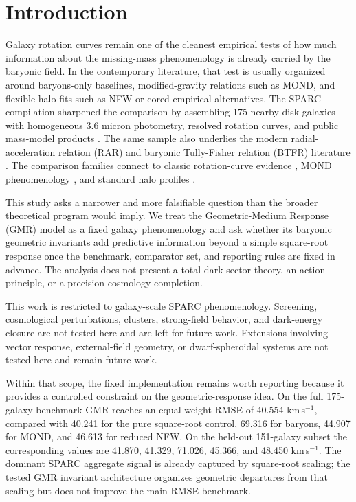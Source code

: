 ﻿\documentclass[twocolumn,linenumbers]{aastex701}
\begin{document}
\section{Introduction}

Galaxy rotation curves remain one of the cleanest empirical tests of how much information about the missing-mass phenomenology is already carried by the baryonic field. In the contemporary literature, that test is usually organized around baryons-only baselines, modified-gravity relations such as MOND, and flexible halo fits such as NFW or cored empirical alternatives. The SPARC compilation sharpened the comparison by assembling 175 nearby disk galaxies with homogeneous 3.6 micron photometry, resolved rotation curves, and public mass-model products \citep{lelli2016}. The same sample also underlies the modern radial-acceleration relation (RAR) and baryonic Tully-Fisher relation (BTFR) literature \citep{mcgaugh2016,lelli2019}. The comparison families connect to classic rotation-curve evidence \citep{rubin1980}, MOND phenomenology \citep{milgrom1983,famaey2012}, and standard halo profiles \citep{navarro1997,burkert1995}.

This study asks a narrower and more falsifiable question than the broader theoretical program would imply. We treat the Geometric-Medium Response (GMR) model as a fixed galaxy phenomenology and ask whether its baryonic geometric invariants add predictive information beyond a simple square-root response once the benchmark, comparator set, and reporting rules are fixed in advance. The analysis does not present a total dark-sector theory, an action principle, or a precision-cosmology completion.

This work is restricted to galaxy-scale SPARC phenomenology. Screening, cosmological perturbations, clusters, strong-field behavior, and dark-energy closure are not tested here and are left for future work. Extensions involving vector response, external-field geometry, or dwarf-spheroidal systems are not tested here and remain future work.

Within that scope, the fixed implementation remains worth reporting because it provides a controlled constraint on the geometric-response idea. On the full 175-galaxy benchmark GMR reaches an equal-weight RMSE of 40.554 km\,s$^{-1}$, compared with 40.241 for the pure square-root control, 69.316 for baryons, 44.907 for MOND, and 46.613 for reduced NFW. On the held-out 151-galaxy subset the corresponding values are 41.870, 41.329, 71.026, 45.366, and 48.450 km\,s$^{-1}$. The dominant SPARC aggregate signal is already captured by square-root scaling; the tested GMR invariant architecture organizes geometric departures from that scaling but does not improve the main RMSE benchmark.
\end{document}
